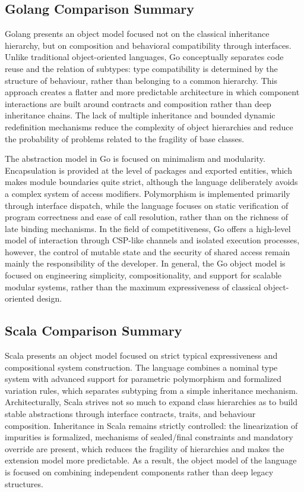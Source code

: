 \subsection{Golang Comparison Summary}

Golang presents an object model focused not on the classical inheritance hierarchy, but on composition and behavioral compatibility through interfaces. Unlike traditional object-oriented languages, Go conceptually separates code reuse and the relation of subtypes: type compatibility is determined by the structure of behaviour, rather than belonging to a common hierarchy. This approach creates a flatter and more predictable architecture in which component interactions are built around contracts and composition rather than deep inheritance chains. The lack of multiple inheritance and bounded dynamic redefinition mechanisms reduce the complexity of object hierarchies and reduce the probability of problems related to the fragility of base classes. 

The abstraction model in Go is focused on minimalism and modularity. Encapsulation is provided at the level of packages and exported entities, which makes module boundaries quite strict, although the language deliberately avoids a complex system of access modifiers. Polymorphism is implemented primarily through interface dispatch, while the language focuses on static verification of program correctness and ease of call resolution, rather than on the richness of late binding mechanisms. In the field of competitiveness, Go offers a high-level model of interaction through CSP-like channels and isolated execution processes, however, the control of mutable state and the security of shared access remain mainly the responsibility of the developer. In general, the Go object model is focused on engineering simplicity, compositionality, and support for scalable modular systems, rather than the maximum expressiveness of classical object-oriented design.

\subsection{Scala Comparison Summary}

Scala presents an object model focused on strict typical expressiveness and compositional system construction. The language combines a nominal type system with advanced support for parametric polymorphism and formalized variation rules, which separates subtyping from a simple inheritance mechanism. Architecturally, Scala strives not so much to expand class hierarchies as to build stable abstractions through interface contracts, traits, and behaviour composition. Inheritance in Scala remains strictly controlled: the linearization of impurities is formalized, mechanisms of sealed/final constraints and mandatory override are present, which reduces the fragility of hierarchies and makes the extension model more predictable. As a result, the object model of the language is focused on combining independent components rather than deep legacy structures.

